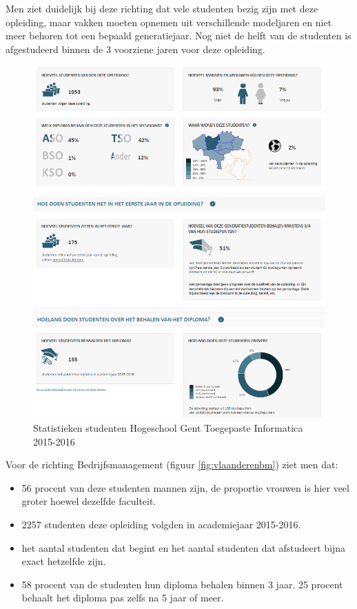 Men ziet duidelijk bij deze richting dat vele studenten bezig zijn met deze opleiding, maar vakken moeten opnemen uit verschillende modeljaren en niet meer behoren tot een bepaald generatiejaar. Nog niet de helft van de studenten is afgestudeerd binnen de 3 voorziene jaren voor deze opleiding.

\begin{figure}
	\includegraphics[width=\textwidth]
	{img/vlaanderen_ti.png}
	\caption{Statistieken studenten Hogeschool Gent Toegepaste Informatica 2015-2016
	\autocite{Onderwijs.vlaanderen.be2017}}
	\label{fig:vlaanderenti}
\end{figure}

Voor de richting Bedrijfsmanagement (figuur \ref{fig:vlaanderenbm}) ziet men dat:
\begin{itemize}
	\item 56 procent van deze studenten mannen zijn, de proportie vrouwen is hier veel groter hoewel dezelfde faculteit.
	\item 2257 studenten deze opleiding volgden in academiejaar 2015-2016.
	\item het aantal studenten dat begint en het aantal studenten dat afstudeert bijna exact hetzelfde zijn.
	\item 58 procent van de studenten hun diploma behalen binnen 3 jaar. 25 procent behaalt het diploma pas zelfs na 5 jaar of meer.
\end{itemize}

